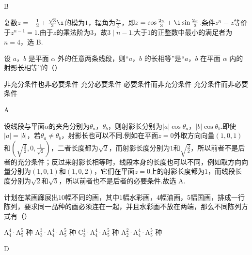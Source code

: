 \documentclass[UTF8,a4paper,oneside,11pt]{ctexbook}
\begin{document}
\begin{answer}
B
\end{answer}

\begin{solution}
复数\(z=-\frac{1}{2}+\frac{\sqrt3}{2}\i\)的模为\(1\)，辐角为\(\frac{2\pi}{3}\)，即\(z=\cos\frac{2\pi}{3}+\i\sin\frac{2\pi}{3}\).条件\(z^n=z\)等价于\(z^{n-1}=1\).由于\(z\)的乘法阶为\(3\)，故\(3\mid n-1\).大于\(1\)的正整数中最小的满足者为\(n=4\)，选 B.
\end{solution}

\begin{problem}
设 \(a\)，\(b\) 是平面 \(\alpha\) 外的任意两条线段，则“\(a\)，\(b\) 的长相等”是“\(a\)，\(b\) 在平面 \(\alpha\) 内的射影长相等”的（\quad）

\choices
    {非充分条件也非必要条件}
    {充分必要条件}
    {必要条件而非充分条件}
    {充分条件而非必要条件}
\end{problem}

\begin{answer}
A
\end{answer}

\begin{solution}
设线段与平面\(\alpha\)的夹角分别为\(\theta_a\)，\(\theta_b\)，则射影长分别为\(|a|\cos\theta_a\)，\(|b|\cos\theta_b\).即使\(|a|=|b|\)，若\(\theta_a\ne\theta_b\)，射影长也可以不同.例如在平面\(z=0\)外取方向向量\((1,0,1)\)和\(\left(\sqrt{\frac32},0,\frac{1}{\sqrt2}\right)\)，二者长度都为\(\sqrt2\)，而射影长度分别为\(1\)和\(\sqrt{\frac32}\)，所以前者不是后者的充分条件；反过来射影长相等时，线段本身的长度也可以不同，例如取方向向量分别为\((1,0,1)\)和\((1,0,2)\)，它们在平面\(z=0\)上的射影长度都为\(1\)，而线段长度分别为\(\sqrt2\)和\(\sqrt5\)，所以前者也不是后者的必要条件.故选 A.
\end{solution}

\begin{problem}
计划在某画廊展出\(10\)幅不同的画，其中\(1\)幅水彩画，\(4\)幅油画，\(5\)幅国画，排成一行陈列，要求同一品种的画必须连在一起，并且水彩画不放在两端，那么不同陈列方式有（\quad）

\choices
    {\(\mathrm A_4^4 \cdot \mathrm A_5^5\) 种}
    {\(\mathrm A_3^3 \cdot \mathrm A_4^4 \cdot \mathrm A_5^5\) 种}
    {\(\mathrm C_3^1 \cdot \mathrm A_4^4 \cdot \mathrm A_5^5\) 种}
    {\(\mathrm A_2^2 \cdot \mathrm A_4^4 \cdot \mathrm A_5^5\) 种}
\end{problem}

\begin{answer}
D
\end{answer}
\end{document}
